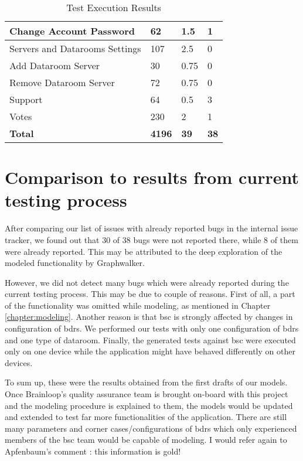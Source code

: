 \begin{table}[]
\begin{tabular}{|l|p{2cm}|p{2cm}|p{2cm}|}
        Change Account Password & 62 & 1.5 & 1 \\
        \hline
        Servers and Datarooms Settings & 107 & 2.5 & 0 \\
        \hline
        Add Dataroom Server & 30 & 0.75 & 0 \\
        \hline
        Remove Dataroom Server & 72 & 0.75 & 0 \\
        \hline
        Support & 64 & 0.5 & 3 \\
        \hline
        Votes & 230 & 2 & 1 \\
        \hline
        \textbf{Total} & \textbf{4196} & \textbf{39} & \textbf{38}\\
        \hline
    \end{tabular}
    \caption{Test Execution Results }
    \label{tab:Test_Results}
\end{table}

\section{Comparison to results from current testing process}

\par
After comparing our list of issues with already reported bugs in the internal issue tracker, we found out that 30 of 38 bugs were not reported there, while 8 of them were already reported. This may be attributed to the deep exploration of the modeled functionality by Graphwalker.

\par
However, we did not detect many bugs which were already reported during the current testing process. This may be due to couple of reasons. First of all, a part of the functionality was omitted while modeling, as mentioned in Chapter \ref{chapter:modeling}. Another reason is that \acrshort{bsc} is strongly affected by changes in configuration of \acrshort{bdrs}. We performed our tests with only one configuration of \acrshort{bdrs} and one type of dataroom. Finally, the generated tests against \acrshort{bsc} were executed only on one device while the application might have behaved differently on other devices.

\par
To sum up, these were the results obtained from the first drafts of our models. Once Brainloop's quality assurance team is brought on-board with this project and the modeling procedure is explained to them, the models would be updated and extended to test far more functionalities of the application. There are still many parameters and corner cases/configurations of \acrshort{bdrs} which only experienced members of the \acrshort{bsc} team would be capable of modeling. I would refer again to Apfenbaum's comment \cite{Apfenbaum_MBT}: this information is gold!

